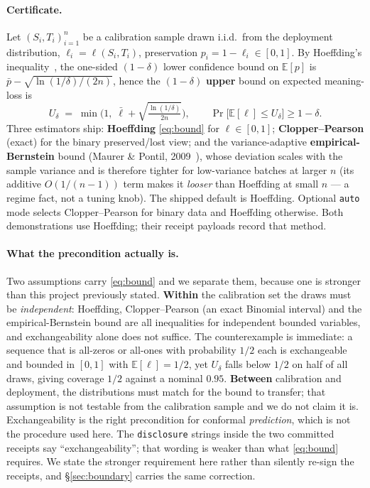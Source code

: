 \documentclass[11pt]{article}
\theoremstyle{definition}
\begin{document}
\paragraph{Certificate.}
Let $(S_i,T_i)_{i=1}^n$ be a calibration sample drawn i.i.d.\ from the
deployment distribution, $\ell_i=\ell(S_i,T_i)$, preservation
$p_i=1-\ell_i\in[0,1]$. By
Hoeffding's inequality~\cite{hoeffding1963}, the one-sided $(1-\delta)$
lower confidence bound on $\mathbb{E}[p]$ is
$\bar p-\sqrt{\ln(1/\delta)/(2n)}$, hence the $(1-\delta)$ \textbf{upper}
bound on expected meaning-loss is
\begin{equation}
U_\delta \;=\; \min\!\Big(1,\; \bar\ell + \sqrt{\tfrac{\ln(1/\delta)}{2n}}\Big),
\qquad \Pr\big[\mathbb{E}[\ell]\le U_\delta\big]\ge 1-\delta. \tag{1}
\label{eq:bound}
\end{equation}
Three estimators ship: \textbf{Hoeffding} \eqref{eq:bound} for
$\ell\in[0,1]$; \textbf{Clopper--Pearson} (exact) for the binary
preserved/lost view; and the variance-adaptive \textbf{empirical-Bernstein}
bound (Maurer \& Pontil, 2009~\cite{maurerpontil2009}), whose deviation
scales with the sample variance and is therefore tighter for low-variance
batches at larger $n$ (its additive $O(1/(n{-}1))$ term makes it
\emph{looser} than Hoeffding at small $n$ --- a regime fact, not a tuning
knob). The shipped default is Hoeffding. Optional \texttt{auto} mode selects
Clopper--Pearson for binary data and Hoeffding otherwise. Both demonstrations
use Hoeffding; their receipt payloads record that method.

\paragraph{What the precondition actually is.}
Two assumptions carry \eqref{eq:bound} and we separate them, because one is
stronger than this project previously stated. \textbf{Within} the calibration
set the draws must be \emph{independent}: Hoeffding, Clopper--Pearson (an
exact Binomial interval) and the empirical-Bernstein bound are all
inequalities for independent bounded variables, and exchangeability alone
does not suffice. The counterexample is immediate: a sequence that is
all-zeros or all-ones with probability $1/2$ each is exchangeable and bounded
in $[0,1]$ with $\mathbb{E}[\ell]=1/2$, yet $U_\delta$ falls below $1/2$ on
half of all draws, giving coverage $1/2$ against a nominal $0.95$.
\textbf{Between} calibration and deployment, the distributions must match for
the bound to transfer; that assumption is not testable from the calibration
sample and we do not claim it is. Exchangeability is the right precondition
for conformal \emph{prediction}, which is not the procedure used here.
The \texttt{disclosure} strings inside the two committed receipts say
``exchangeability''; that wording is weaker than what \eqref{eq:bound}
requires. We state the stronger requirement here rather than silently re-sign
the receipts, and \S\ref{sec:boundary} carries the same correction.
\end{document}
